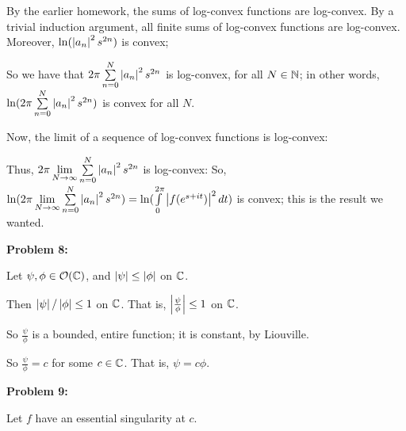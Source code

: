 \documentclass[a4paper,12pt]{article}
\begin{document}
By the earlier homework, the sums of log-convex functions are log-convex. By a trivial induction argument, all finite sums of log-convex functions are log-convex. Moreover, $\ln(\left\lvert a_n \right\rvert^2 s^{2n})$ is convex; %

So we have that $2\pi \sum\limits_{n=0}^N \left\lvert a_n \right\rvert^2 s^{2n}$ is log-convex, for all $N \in \mathbb{N}$; in other words, $\ln(2\pi \sum\limits_{n=0}^N \left\lvert a_n \right\rvert^2 s^{2n})$ is convex for all $N$.

Now, the limit of a sequence of log-convex functions is log-convex: %

Thus, $2\pi \lim\limits_{N \to \infty}\sum\limits_{n=0}^N \left\lvert a_n \right\rvert^2 s^{2n}$ is log-convex: So, $\ln(2\pi \lim\limits_{N \to \infty}\sum\limits_{n=0}^N \left\lvert a_n \right\rvert^2 s^{2n}) = \ln(\int\limits_0^{2\pi} \left\lvert f(e^{s+it}) \right\rvert^2 dt)$ is convex; this is the result we wanted.

\shunt

{\bf Problem 8:}

Let $\psi, \phi \in \mathcal{O}(\mathbb{C})$, and $\left\lvert \psi \right\rvert \leq \left\lvert \phi \right\rvert$ on $\mathbb{C}$.

Then $\left\lvert \psi \right\rvert/\left\lvert \phi \right\rvert \leq 1$ on $\mathbb{C}$. That is, $\left\lvert \frac{\psi}{\phi} \right\rvert \leq 1$ on $\mathbb{C}$.

So $\frac{\psi}{\phi}$ is a bounded, entire function; it is constant, by Liouville.

So $\frac{\psi}{\phi} = c$ for some $c \in \mathbb{C}$. That is, $\psi = c \phi$.

\shunt

{\bf Problem 9:}

Let $f$ have an essential singularity at $c$.

\shunt
\end{document}
